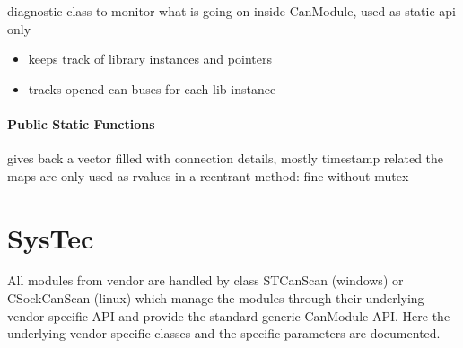 \documentclass[a4paper,10pt,english]{sphinxmanual}
\begin{document}
\begin{fulllineitems}
\label{\detokenize{classestracing:_CPPv4N9CanModule4DiagE}}%
\pysigstartmultiline
{}%
\pysigstopmultiline
diagnostic class to monitor what is going on inside CanModule, used as static api only\begin{itemize}
\item {} 
keeps track of library instances and pointers

\item {} 
tracks opened can buses for each lib instance 

\end{itemize}

\subsubsection*{Public Static Functions}

\begin{fulllineitems}
\label{\detokenize{classestracing:_CPPv4N9CanModule4Diag15get_connectionsEv}}%
\pysigstartmultiline
{}%
\pysigstopmultiline
gives back a vector filled with connection details, mostly timestamp related the maps are only used as rvalues in a reentrant method: fine without mutex 

\end{fulllineitems}


\end{fulllineitems}



\chapter{SysTec}
\label{\detokenize{vendors/systec:systec}}\label{\detokenize{vendors/systec::doc}}
All modules from vendor {\hyperref[\detokenize{vendors/systec:systec}]{}} are handled by class STCanScan (windows) or CSockCanScan (linux) which
manage the modules through their underlying vendor specific API and provide the standard generic CanModule API.
Here the underlying vendor specific classes and the specific parameters are documented.
\end{document}
